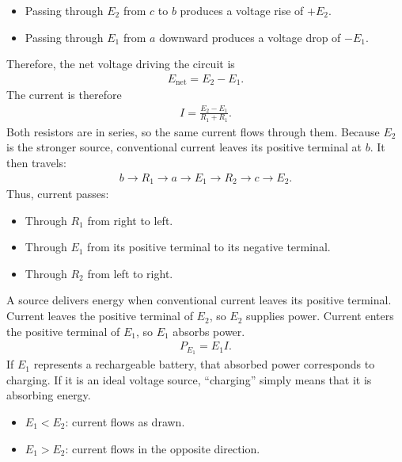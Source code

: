 \documentclass{report}
\begin{document}
\begin{itemize}
\begin{itemize}
                \item Passing through \(E_2\) from \(c\) to \(b\) produces a voltage rise of \(+E_2\).
                \item Passing through \(E_1\) from \(a\) downward produces a voltage drop of \(-E_1\).
            \end{itemize}
            Therefore, the net voltage driving the circuit is
            \begin{align*}
                E_{\text{net}} = E_{2} - E_{1}
            .\end{align*}
            The current is therefore
            \begin{align*}
                I = \frac{E_{2} - E_{1}}{R_{1} + R_{1}}
            .\end{align*}
            Both resistors are in series, so the same current flows through them.
            \bigbreak \noindent 
            Because \(E_2\) is the stronger source, conventional current leaves its positive terminal at \(b\). It then travels:
            \begin{align*}
               b \to R_{1} \to a \to E_{1} \to R_{2} \to c \to E_{2} 
            .\end{align*}
            Thus, current passes:
            \begin{itemize}
                \item Through \(R_1\) from right to left.
                \item Through \(E_1\) from its positive terminal to its negative terminal.
                \item Through \(R_2\) from left to right.
            \end{itemize}
            A source delivers energy when conventional current leaves its positive terminal. Current leaves the positive terminal of \(E_2\), so \(E_2\) supplies power.
            \bigbreak \noindent 
            Current enters the positive terminal of $E_{1}$, so $E_{1}$ absorbs power.
            \begin{align*}
                P_{E_{1}} = E_{1}I
            .\end{align*}
            If \(E_1\) represents a rechargeable battery, that absorbed power corresponds to charging. If it is an ideal voltage source, “charging” simply means that it is absorbing energy.
            \begin{itemize}
                \item \(E_{1} < E_{2}\): current flows as drawn.
                \item \(E_1>E_2\): current flows in the opposite direction.

\end{itemize}
\end{itemize}
\end{document}
